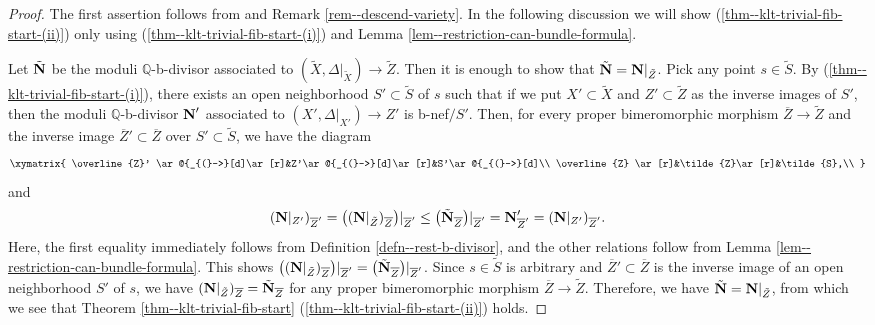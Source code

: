 \documentclass[12pt]{amsart}
\theoremstyle{definition}
\begin{document}
\begin{proof}
The first assertion follows from \cite[Theorem 21.4]{fujino-analytic-bchm} and Remark \ref{rem--descend-variety}. 
In the following discussion we will show 
(\ref{thm--klt-trivial-fib-start-(ii)}) only using (\ref{thm--klt-trivial-fib-start-(i)}) and Lemma \ref{lem--restriction-can-bundle-formula}. 

Let $\tilde{\boldsymbol{\rm N}}$ be the moduli $\mathbb{Q}$-b-divisor associated to $(\tilde{X}, \Delta|_{\tilde{X}}) \to \tilde{Z}$. 
Then it is enough to show that $\tilde{\boldsymbol{\rm N}}= \boldsymbol{\rm N}|_{\tilde{Z}}$. 
Pick any point $s \in \tilde{S}$. 
By (\ref{thm--klt-trivial-fib-start-(i)}), there exists an open neighborhood $S' \subset \tilde{S}$ of $s$ such that if we put $X' \subset \tilde{X}$ and $Z' \subset \tilde{Z}$ as the inverse images of $S'$, then the moduli $\mathbb{Q}$-b-divisor $\boldsymbol{\rm N}'$ associated to $(X', \Delta|_{X'}) \to Z'$ is b-nef$/S'$. 
Then, for every proper bimeromorphic morphism $\overline{Z} \to \tilde{Z}$ and the inverse image $\overline{Z}' \subset \overline{Z}$ over $S' \subset \tilde{S}$, we have the diagram
$$
\xymatrix{
 \overline{Z}' \ar@{_{(}->}[d]\ar[r]&Z'\ar@{_{(}->}[d]\ar[r]&S'\ar@{_{(}->}[d]\\
 \overline{Z} \ar[r]&\tilde{Z}\ar[r]&\tilde{S},\\
}
$$
and 
\begin{equation*}
\begin{split}
(\boldsymbol{\rm N}|_{Z'})_{\overline{Z}'}=\bigl((\boldsymbol{\rm N}|_{\tilde{Z}})_{\overline{Z}}\bigr)|_{\overline{Z}'} \leq  \bigl(\tilde{\boldsymbol{\rm N}}_{\overline{Z}}\bigr)|_{\overline{Z}'} = \boldsymbol{\rm N}'_{\overline{Z}'}=(\boldsymbol{\rm N}|_{Z'})_{\overline{Z}'}.
\end{split}
\end{equation*}
Here, the first equality immediately follows from Definition \ref{defn--rest-b-divisor}, and the other relations follow from Lemma \ref{lem--restriction-can-bundle-formula}. 
This shows $\bigl((\boldsymbol{\rm N}|_{\tilde{Z}})_{\overline{Z}}\bigr)|_{\overline{Z}'} =  \bigl(\tilde{\boldsymbol{\rm N}}_{\overline{Z}}\bigr)|_{\overline{Z}'}$. 
Since $s \in \tilde{S}$ is arbitrary and $\overline{Z}' \subset \overline{Z}$ is the inverse image of an open neighborhood $S'$ of $s$, we have 
$(\boldsymbol{\rm N}|_{\tilde{Z}})_{\overline{Z}} =  \tilde{\boldsymbol{\rm N}}_{\overline{Z}}$
for any proper bimeromorphic morphism $\overline{Z} \to \tilde{Z}$. 
Therefore, we have $\tilde{\boldsymbol{\rm N}}= \boldsymbol{\rm N}|_{\tilde{Z}}$, from which we see that Theorem \ref{thm--klt-trivial-fib-start} (\ref{thm--klt-trivial-fib-start-(ii)}) holds. 
\end{proof}
\end{document}
